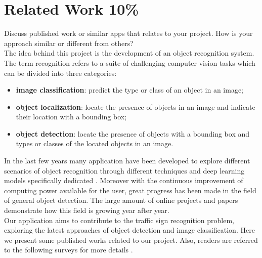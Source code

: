 \section{Related Work 10\%}
Discuss published work or similar apps that relates to your project. How is your approach similar or different from others?\\
The idea behind this project is the development of an object recognition system. The term recognition refers to a suite of challenging computer vision tasks which can be divided into three categories:
\begin{itemize}
	\item\textbf{image classification}: predict the type or class of an object in an image;
	\item\textbf{object localization}: locate the presence of objects in an image and indicate their location with a bounding box;
	\item\textbf{object detection}: locate the presence of objects with a bounding box and types or classes of the located objects in an image.
\end{itemize}
In the last few years many application have been developed to explore different scenarios of object recognition through different techniques and deep learning models specifically dedicated \cite{wangMethods, tsrWithCnn, tsrWithCnn2}. Moreover with the continuous improvement of computing power available for the user, great progress has been made in the field of general object detection. The large amount of online projects and papers demonstrate how this field is growing year after year.\\
Our application aims to contribute to the traffic sign recognition problem, exploring the latest approaches of object detection and image classification. Here we present some published works related to our project. Also, readers are referred to the following surveys for more details \cite{tsr20}.


